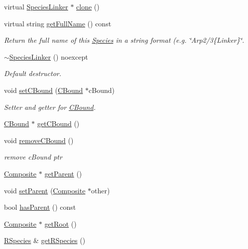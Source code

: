 \begin{DoxyCompactItemize}
virtual \hyperlink{classSpeciesLinker}{Species\+Linker} $\ast$ \hyperlink{classSpeciesLinker_a5555ddb310465ae43ec89927236d2fc8}{clone} ()
\item 
virtual string \hyperlink{classSpeciesLinker_a4f964e32cd7d13d86ea75cb962511f3a}{get\+Full\+Name} () const 
\begin{DoxyCompactList}\small\item\em Return the full name of this \hyperlink{classSpecies}{Species} in a string format (e.\+g. \char`\"{}\+Arp2/3\{\+Linker\}\char`\"{}. \end{DoxyCompactList}\item 
\hyperlink{classSpeciesLinker_a771670554e12d3a59039834254dade23}{$\sim$\+Species\+Linker} () noexcept
\begin{DoxyCompactList}\small\item\em Default destructor. \end{DoxyCompactList}\item 
void \hyperlink{classSpeciesBound_a33c3de1c4a1e2f63f390b2bfd53fcfa1}{set\+C\+Bound} (\hyperlink{classCBound}{C\+Bound} $\ast$c\+Bound)
\begin{DoxyCompactList}\small\item\em Setter and getter for \hyperlink{classCBound}{C\+Bound}. \end{DoxyCompactList}\item 
\hyperlink{classCBound}{C\+Bound} $\ast$ \hyperlink{classSpeciesBound_ad55d11c86de01f2381ac9d5a286d8cea}{get\+C\+Bound} ()
\item 
void \hyperlink{classSpeciesBound_a904307cc8343605a9dbb05d4f2fa6bf9}{remove\+C\+Bound} ()
\begin{DoxyCompactList}\small\item\em remove c\+Bound ptr \end{DoxyCompactList}\item 
\hyperlink{classComposite}{Composite} $\ast$ \hyperlink{classSpecies_af24cab7cbaa561d35b08fef5faf05fdf}{get\+Parent} ()
\item 
void \hyperlink{classSpecies_acc64c5b61abf911872d433ac32b62de8}{set\+Parent} (\hyperlink{classComposite}{Composite} $\ast$other)
\item 
bool \hyperlink{classSpecies_a40262d7217fcc28a31682aee40a19232}{has\+Parent} () const 
\item 
\hyperlink{classComposite}{Composite} $\ast$ \hyperlink{classSpecies_a876c8a827476a11e05f3b7a7669c29b6}{get\+Root} ()
\item 
\hyperlink{classRSpecies}{R\+Species} \& \hyperlink{classSpecies_a048dd7bc3fecd08b1b1797dc83aa163d}{get\+R\+Species} ()

\end{DoxyCompactItemize}
